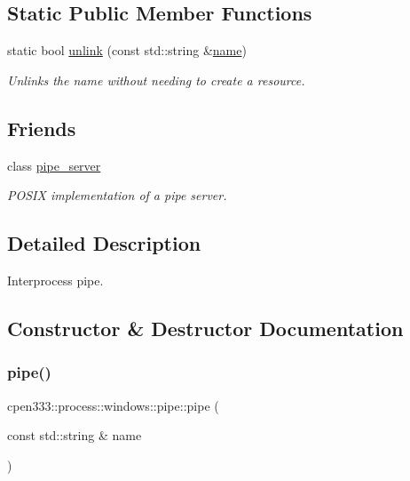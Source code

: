 \subsection*{Static Public Member Functions}
\begin{DoxyCompactItemize}
\item 
static bool \hyperlink{classcpen333_1_1process_1_1windows_1_1pipe_a82f71e3bb08dab1a32421062173d09da}{unlink} (const std\+::string \&\hyperlink{classcpen333_1_1process_1_1impl_1_1named__resource__base_a53986a0a1dd26a3602b842c45613b79d}{name})
\begin{DoxyCompactList}\small\item\em Unlinks the name without needing to create a resource. \end{DoxyCompactList}\end{DoxyCompactItemize}
\subsection*{Friends}
\begin{DoxyCompactItemize}
\item 
class \hyperlink{classcpen333_1_1process_1_1windows_1_1pipe_ab111e84ef31179e72c2bd2e58e2042b0}{pipe\+\_\+server}
\begin{DoxyCompactList}\small\item\em P\+O\+S\+IX implementation of a pipe server. \end{DoxyCompactList}\end{DoxyCompactItemize}


\subsection{Detailed Description}
Interprocess pipe. 

\subsection{Constructor \& Destructor Documentation}
\mbox{\label{classcpen333_1_1process_1_1windows_1_1pipe_a2b63d6b649093ce1b883c3ae418db620}} 
\subsubsection{\texorpdfstring{pipe()}{pipe()}\hspace{0.1cm}{\footnotesize\ttfamily [1/2]}}
{\footnotesize\ttfamily cpen333\+::process\+::windows\+::pipe\+::pipe (\begin{DoxyParamCaption}\item[{const std\+::string \&}]{name }\end{DoxyParamCaption})\hspace{0.3cm}{\ttfamily [inline]}}



